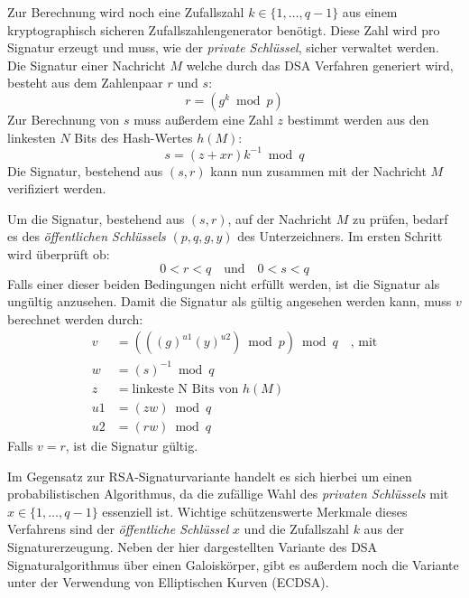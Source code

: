 \documentclass[11pt,a4paper,ngerman]{scrreprt}
\begin{document}
\begin{description}[font=\rmfamily]
    Zur Berechnung wird noch eine Zufallszahl $k \in \{ 1, \ldots, q - 1 \}$ aus einem kryptographisch sicheren Zufallszahlengenerator benötigt. Diese Zahl wird pro Signatur erzeugt und muss, wie der \emph{private Schlüssel}, sicher verwaltet werden. Die Signatur einer Nachricht $M$ welche durch das DSA Verfahren generiert wird, besteht aus dem Zahlenpaar $r$ und $s$:
    \[
        r = (g^k \bmod p)
    \]
    Zur Berechnung von $s$ muss außerdem eine Zahl $z$ bestimmt werden aus den linkesten $N$ Bits des Hash-Wertes $h(M)$:
    \[
        s = (z + xr)k^{-1} \bmod q
    \]
    Die Signatur, bestehend aus $(s, r)$ kann nun zusammen mit der Nachricht $M$ verifiziert werden.
    \item[Signaturverifikation] Um die Signatur, bestehend aus $(s, r)$, auf der Nachricht $M$ zu prüfen, bedarf es des \emph{öffentlichen Schlüssels} $(p, q, g, y)$ des Unterzeichners. Im ersten Schritt wird überprüft ob: 
    \[
        0 < r < q \quad\textrm{und}\quad 0 < s < q
    \]
    Falls einer dieser beiden Bedingungen nicht erfüllt werden, ist die Signatur als ungültig anzusehen. Damit die Signatur als gültig angesehen werden kann, muss $v$ berechnet werden durch:
    \begin{align*}
        v& = (((g)^{u1}(y)^{u2}) \bmod p) \bmod q \quad\textrm{, mit}\\
        w& = (s)^{-1} \bmod q \\
        z& = \textrm{linkeste N Bits von $h(M)$} \\
        u1& = (zw) \bmod q \\
        u2& = (rw) \bmod q
    \end{align*}
    Falls $v = r$, ist die Signatur gültig.
    \item[Anmerkungen]
    Im Gegensatz zur RSA-Signaturvariante handelt es sich hierbei um einen probabilistischen Algorithmus, da die zufällige Wahl des \emph{privaten Schlüssels} mit $x \in \{1, \ldots, q - 1 \}$ essenziell ist. Wichtige schützenswerte Merkmale dieses Verfahrens sind der \emph{öffentliche Schlüssel} $x$ und die Zufallszahl $k$ aus der Signaturerzeugung. Neben der hier dargestellten Variante des DSA Signaturalgorithmus über einen Galoiskörper, gibt es außerdem noch die Variante unter der Verwendung von Elliptischen Kurven (ECDSA).
\end{description}
\end{document}
